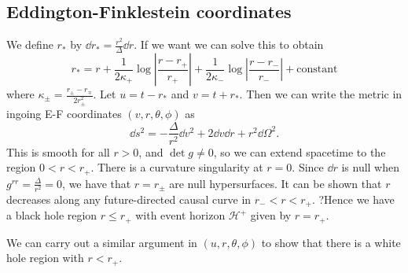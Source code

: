 \documentclass{jknotes}
\begin{document}
\subsection{Eddington-Finklestein coordinates}
We define \(r_*\) by \(\dd{r_*} = \frac{r^2}{\Delta}\dd{r}\). If we want we can solve this to obtain
\begin{equation}
    r_* = r + \frac{1}{2\kappa_+}\log\left|\frac{r-r_+}{r_+}\right| + \frac{1}{2\kappa_-}\log\left|\frac{r-r_-}{r_-}\right| + \text{constant}
\end{equation}
where \(\kappa_\pm = \frac{r_\pm-r_\mp}{2r_\pm^2}\). Let \(u = t-r_*\) and \(v = t+r_*\). Then we can write the metric in ingoing E-F coordinates \((v,r,\theta,\phi)\) as
\begin{equation}
    \dd{s}^2 = -\frac{\Delta}{r^2}\dd{v}^2 + 2\dd{v}\dd{r} + r^2\dd{\Omega}^2.
\end{equation}
This is smooth for all \(r>0\), and \(\det g \ne 0\), so we can extend spacetime to the region \(0<r<r_+\). There is a curvature singularity at \(r=0\). Since \(\dd{r}\) is null when \(g^{rr} = \frac{\Delta}{r^2} = 0\), we have that \(r=r_\pm\) are null hypersurfaces. It can be shown that \(r\) decreases along any future-directed causal curve in \(r_-<r<r_+\). ?Hence we have a black hole region \(r\le r_+\) with event horizon \(\mathcal{H}^+\) given by \(r=r_+\).

We can carry out a similar argument in \((u,r,\theta,\phi)\) to show that there is a white hole region with \(r<r_+\).
\end{document}
